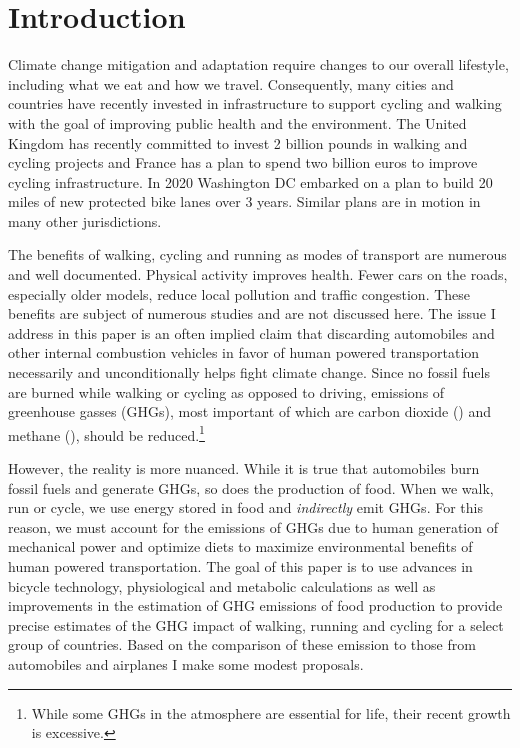 \documentclass{article}[12pt,letterpaper]
\begin{document}
\section{Introduction}
Climate change mitigation and adaptation require changes to our overall lifestyle, including what we eat and how we travel. Consequently, many cities and countries have recently invested in infrastructure to support cycling and walking with the goal of improving public health and the environment. The United Kingdom has recently committed to invest 2 billion pounds in walking and cycling projects and France has a plan to spend two billion euros to improve cycling infrastructure. In 2020 Washington DC embarked on a plan to build 20 miles of new protected bike lanes over 3 years. Similar plans are in motion in many other jurisdictions.

The benefits of walking, cycling and running as modes of transport are numerous and well documented. Physical activity improves health. Fewer cars on the roads, especially older models, reduce local pollution and traffic congestion. These benefits are subject of numerous studies and are not discussed here. The issue I address in this paper is an often implied claim that discarding automobiles and other internal combustion vehicles in favor of human powered transportation necessarily and unconditionally helps fight climate change. Since no fossil fuels are burned while walking or cycling as opposed to driving, emissions of greenhouse gasses (GHGs), most important of which are carbon dioxide (\cadi) and methane (\methane), should be reduced.\footnote{While some GHGs in the atmosphere are essential for life, their recent growth is excessive.} 

However, the reality is more nuanced. While it is true that automobiles burn fossil fuels and generate GHGs, so does the production of food. When we walk, run or cycle, we use energy stored in food and {\em indirectly} emit GHGs. For this reason, we must account for the emissions of GHGs due to human generation of mechanical power and optimize diets to maximize environmental benefits of human powered transportation. The goal of this paper is to use advances in bicycle technology, physiological and metabolic calculations as well as improvements in the estimation of GHG emissions of food production to provide precise estimates of the GHG impact of walking, running and cycling for a select group of countries. Based on the comparison of these emission to those from automobiles and airplanes I make some modest proposals.
\end{document}
